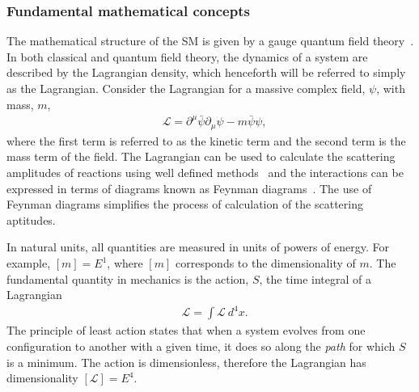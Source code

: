 \subsubsection{Fundamental mathematical concepts}
The mathematical structure of the SM is given by a gauge quantum field theory~\cite{Peskin1995}. In both classical and quantum field theory, the dynamics of a system are described by the Lagrangian density, which henceforth will be referred to simply as the Lagrangian. Consider the Lagrangian for a massive complex field, $\psi$, with mass, $m$, 
\begin{equation}
    \label{eq:lagrangian_example}
    \begin{aligned}
        & \mathcal{L} = \partial^\mu\bar{\psi}\partial_\mu\psi - m\bar{\psi}\psi,
    \end{aligned}
\end{equation}
where the first term is referred to as the kinetic term and the second term is the mass term of the field. The Lagrangian can be used to calculate the scattering amplitudes of reactions using well defined methods~\cite{Lehmann1955} and the interactions can be expressed in terms of diagrams known as Feynman diagrams~\cite{Thomson:2013zua}. The use of Feynman diagrams simplifies the process of calculation of the scattering aptitudes.

In natural units, all quantities are measured in units of powers of energy. For example, $[m] = E^1$, where $[m]$ corresponds to the dimensionality of $m$. The fundamental quantity in mechanics is the action, $S$, the time integral of a Lagrangian~\cite{Peskin1995}
\begin{equation}
    \label{eq:action}
    \begin{aligned}
        & \mathcal{L} = \int \mathcal{L}~d^4x.
    \end{aligned}
\end{equation}
The principle of least action states that when a system evolves from one configuration to another with a given time, it does so along the \emph{path} for which $S$ is a minimum. The action is dimensionless, therefore the Lagrangian has dimensionality $[\mathcal{L}] = E^4$.

